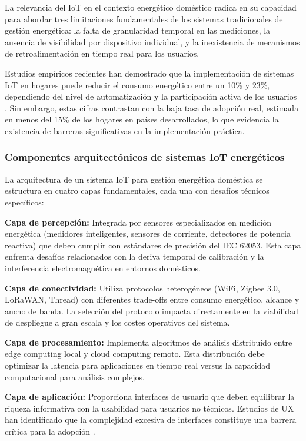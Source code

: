 La relevancia del IoT en el contexto energético doméstico radica en su capacidad para abordar tres limitaciones fundamentales de los sistemas tradicionales de gestión energética: la falta de granularidad temporal en las mediciones, la ausencia de visibilidad por dispositivo individual, y la inexistencia de mecanismos de retroalimentación en tiempo real para los usuarios.

Estudios empíricos recientes han demostrado que la implementación de sistemas IoT en hogares puede reducir el consumo energético entre un 10\% y 23\%, dependiendo del nivel de automatización y la participación activa de los usuarios \cite{iea2022digitalization}. Sin embargo, estas cifras contrastan con la baja tasa de adopción real, estimada en menos del 15\% de los hogares en países desarrollados, lo que evidencia la existencia de barreras significativas en la implementación práctica.

\subsubsection{Componentes arquitectónicos de sistemas IoT energéticos}

La arquitectura de un sistema IoT para gestión energética doméstica se estructura en cuatro capas fundamentales, cada una con desafíos técnicos específicos:

\textbf{Capa de percepción:} Integrada por sensores especializados en medición energética (medidores inteligentes, sensores de corriente, detectores de potencia reactiva) que deben cumplir con estándares de precisión del IEC 62053. Esta capa enfrenta desafíos relacionados con la deriva temporal de calibración y la interferencia electromagnética en entornos domésticos.

\textbf{Capa de conectividad:} Utiliza protocolos heterogéneos (WiFi, Zigbee 3.0, LoRaWAN, Thread) con diferentes trade-offs entre consumo energético, alcance y ancho de banda. La selección del protocolo impacta directamente en la viabilidad de despliegue a gran escala y los costes operativos del sistema.

\textbf{Capa de procesamiento:} Implementa algoritmos de análisis distribuido entre edge computing local y cloud computing remoto. Esta distribución debe optimizar la latencia para aplicaciones en tiempo real versus la capacidad computacional para análisis complejos.

\textbf{Capa de aplicación:} Proporciona interfaces de usuario que deben equilibrar la riqueza informativa con la usabilidad para usuarios no técnicos. Estudios de UX han identificado que la complejidad excesiva de interfaces constituye una barrera crítica para la adopción \cite{froehlich2010sensing}.


